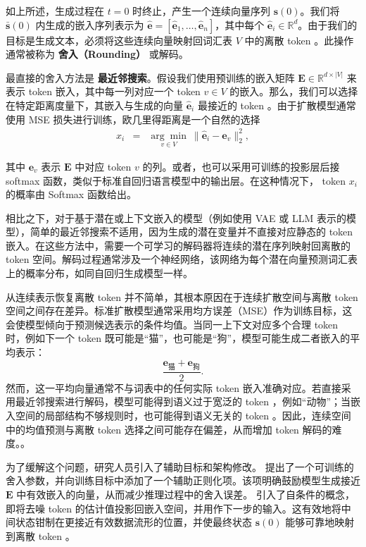 如上所述，生成过程在 $t=0$ 时终止，产生一个连续向量序列 $\mathbf{s}(0)$。我们将 $\bar{\mathbf{s}}(0)$ 内生成的嵌入序列表示为 $\hat{\mathbf{e}} = [\hat{\mathbf{e}}_1, \dots, \hat{\mathbf{e}}_n]$，其中每个 $\hat{\mathbf{e}}_i \in \mathbb{R}^d$。由于我们的目标是生成文本，必须将这些连续向量映射回词汇表 $V$ 中的离散 token 。此操作通常被称为 \textbf{舍入（Rounding）} 或解码。

最直接的舍入方法是 \textbf{最近邻搜索}。假设我们使用预训练的嵌入矩阵 $\mathbf{E} \in \mathbb{R}^{d \times |V|}$ 来表示 token 嵌入，其中每一列对应一个 token $v \in V$ 的嵌入。那么，我们可以选择在特定距离度量下，其嵌入与生成的向量 $\hat{\mathbf{e}}_i$ 最接近的 token 。由于扩散模型通常使用 MSE 损失进行训练，欧几里得距离是一个自然的选择
\begin{eqnarray}
x_i & = & \underset{v \in V}{\arg\min} \ \|\hat{\mathbf{e}}_i - \mathbf{e}_v\|_2^2,
\end{eqnarray}

\noindent 其中 $\mathbf{e}_v$ 表示 $\mathbf{E}$ 中对应 token $v$ 的列。或者，也可以采用可训练的投影层后接 softmax 函数，类似于标准自回归语言模型中的输出层。在这种情况下， token $x_i$ 的概率由 Softmax 函数给出。

相比之下，对于基于潜在或上下文嵌入的模型（例如使用 VAE 或 LLM 表示的模型），简单的最近邻搜索不适用，因为生成的潜在变量并不直接对应静态的 token 嵌入。在这些方法中，需要一个可学习的解码器将连续的潜在序列映射回离散的 token 空间。解码过程通常涉及一个神经网络，该网络为每个潜在向量预测词汇表上的概率分布，如同自回归生成模型一样。

从连续表示恢复离散 token 并不简单，其根本原因在于连续扩散空间与离散 token 空间之间存在差异。标准扩散模型通常采用均方误差（MSE）作为训练目标，这会使模型倾向于预测候选表示的条件均值。当同一上下文对应多个合理 token 时，例如下一个 token 既可能是“猫”，也可能是“狗”，模型可能生成二者嵌入的平均表示：
\[
\frac{\mathbf{e}_{\text{猫}}+\mathbf{e}_{\text{狗}}}{2}.
\]
然而，这一平均向量通常不与词表中的任何实际 token 嵌入准确对应。若直接采用最近邻搜索进行解码，模型可能得到语义过于宽泛的 token ，例如“动物”；当嵌入空间的局部结构不够规则时，也可能得到语义无关的 token 。因此，连续空间中的均值预测与离散 token 选择之间可能存在偏差，从而增加 token 解码的难度。。

为了缓解这个问题，研究人员引入了辅助目标和架构修改。\citet{li-etal:2022diffusion} 提出了一个可训练的舍入参数，并向训练目标中添加了一个辅助正则化项。该项明确鼓励模型生成接近 $\mathbf{E}$ 中有效嵌入的向量，从而减少推理过程中的舍入误差。\citet{strudel-etal:2022self} 引入了自条件的概念，即将去噪 token 的估计值投影回嵌入空间，并用作下一步的输入。这有效地将中间状态钳制在更接近有效数据流形的位置，并使最终状态 $\mathbf{s}(0)$ 能够可靠地映射到离散 token 。
